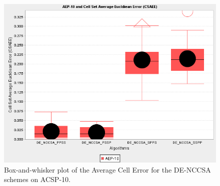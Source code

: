 \begin{figure}[htp]
	\centering
		\includegraphics[scale=0.40]{Cells/DE-NCCSA-ACE}
	\caption{Box-and-whisker plot of the Average Cell Error for the DE-NCCSA schemes on ACSP-10.}
	\label{fig:cells:network:denccsa:ace:boxplot}
\end{figure}

